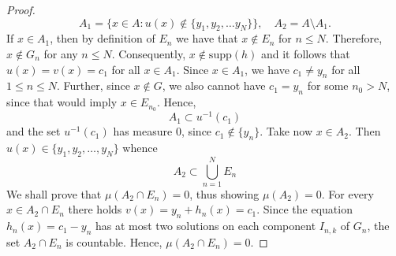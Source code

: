 \documentclass{amsart}
\numberwithin{equation}{section}
\begin{document}
\begin{proof}
    \begin{equation}
        \nonumber
        A_1=\{x\in A: u(x)\notin\{y_1,y_2,\ldots y_N\}\},\quad A_2=A\setminus A_1.
    \end{equation}
    If $x\in A_1$, then by definition of $E_n$ we have that $x\notin E_n$ for $n\le N$. Therefore, $x\notin G_n$ for any $n\le N$. Consequently, $x\notin\text{supp}(h)$ and it follows that $u(x)=v(x)=c_1$ for all $x\in A_1$.
    Since $x\in A_1$, we have $c_1\neq y_n$ for all $1\le n\le N$. Further, since $x\notin G$, we also cannot have $c_1=y_n$ for some $n_0>N$, since that would imply $x\in E_{n_0}$. Hence,
    $$
    A_1\subset u^{-1}(c_1)
    $$
    and the set $u^{-1}(c_1)$ has measure 0, since $c_1\notin\{y_n\}$.
    Take now $x\in A_2$. Then $u(x)\in\{y_1,y_2,\ldots,y_N\}$ whence
    \begin{equation}
        \nonumber
        A_2\subset \bigcup_{n=1}^NE_n
    \end{equation}
    We shall prove that $\mu(A_2\cap E_n)=0$, thus showing $\mu(A_2)=0$. For every $x\in A_2\cap E_n$ there holds $v(x)=y_n+h_n(x)=c_1$. Since the equation $h_n(x)=c_1-y_n$ has at most two solutions on each component $I_{n,k}$ of $G_n$, the set $A_2\cap E_n$ is countable. Hence, $\mu(A_2\cap E_n)=0$.    
\end{proof}
\end{document}
